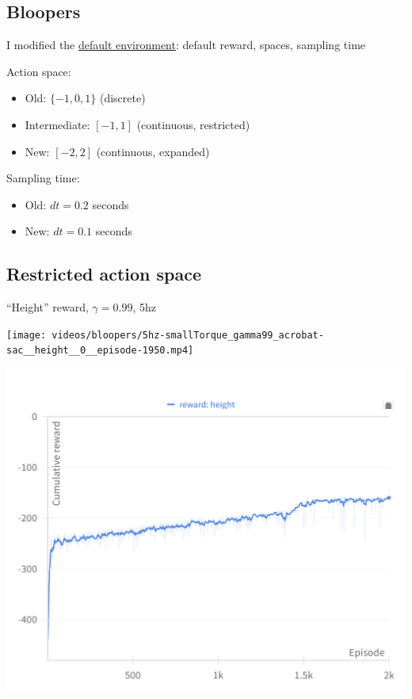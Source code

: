 \documentclass[
  letterpaper,
  DIV=11,
  numbers=noendperiod,
  oneside]{scrartcl}
\providecommand{\tightlist}{%
  \setlength{\itemsep}{0pt}\setlength{\parskip}{0pt}}\usepackage{longtable,booktabs,array}
\begin{document}

\subsection{Bloopers}\label{bloopers}

I modified the
\href{(https://github.com/Farama-Foundation/Gymnasium/blob/main/gymnasium/envs/classic_control/acrobot.py)}{default
environment}: default reward, spaces, sampling time

Action space:

\begin{itemize}
\tightlist
\item
  Old: \(\{-1, 0, 1\}\) (discrete)
\item
  Intermediate: \([-1, 1]\) (continuous, restricted)
\item
  New: \([-2, 2]\) (continuous, expanded)
\end{itemize}

Sampling time:

\begin{itemize}
\tightlist
\item
  Old: \(dt = 0.2\) seconds
\item
  New: \(dt = 0.1\) seconds
\end{itemize}

\subsection{Restricted action space}\label{restricted-action-space}

``Height'' reward, \(\gamma = 0.99\), 5hz

\texttt{[image: videos/bloopers/5hz-smallTorque\_gamma99\_acrobat-sac\_\_height\_\_0\_\_episode-1950.mp4]}

\includegraphics[width=1\textwidth,height=\textheight]{figs/reward_blooper_height_gamma_99.png}
\end{document}
